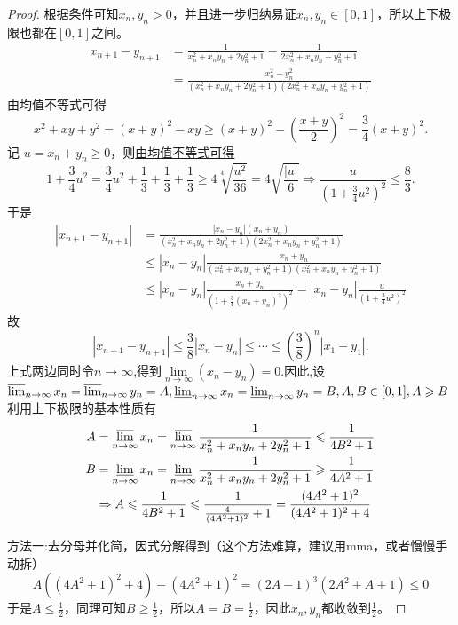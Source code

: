 \documentclass[../../main.tex]{subfiles}%
\begin{document}
\begin{proof}
根据条件可知\(x_n,y_n > 0\)，并且进一步归纳易证\(x_n,y_n\in[0,1]\)，所以上下极限也都在\([0,1]\)之间。
\begin{align*}
x_{n + 1}-y_{n + 1}&=\frac{1}{x_n^2 + x_ny_n + 2y_n^2 + 1}-\frac{1}{2x_n^2 + x_ny_n + y_n^2 + 1}\\
&=\frac{x_n^2 - y_n^2}{(x_n^2 + x_ny_n + 2y_n^2 + 1)(2x_n^2 + x_ny_n + y_n^2 + 1)}
\end{align*}
由均值不等式可得
\[
x^2 + xy + y^2=(x + y)^2 - xy\geqslant (x + y)^2 - \left(\frac{x + y}{2}\right)^2=\frac{3}{4}(x + y)^2.
\]
记 \(u = x_n + y_n\geqslant  0\)，则\hyperlink{均值放缩的思路}{由均值不等式可得}
\[
1+\frac{3}{4}u^2=\frac{3}{4}u^2+\frac{1}{3}+\frac{1}{3}+\frac{1}{3}\geqslant  4\sqrt[4]{\frac{u^2}{36}}=4\sqrt{\frac{|u|}{6}}\Rightarrow \frac{u}{(1+\frac{3}{4}u^2)^2}\leqslant \frac{8}{3}.
\]
于是
\begin{align*}
|x_{n + 1}-y_{n + 1}|&=\frac{|x_n - y_n|(x_n + y_n)}{(x_{n}^{2}+x_ny_n + 2y_{n}^{2}+1)(2x_{n}^{2}+x_ny_n + y_{n}^{2}+1)}\\
&\leqslant |x_n - y_n|\frac{x_n + y_n}{(x_{n}^{2}+x_ny_n + y_{n}^{2}+1)(x_{n}^{2}+x_ny_n + y_{n}^{2}+1)}\\
&\leqslant |x_n - y_n|\frac{x_n + y_n}{(1+\frac{3}{4}(x_n + y_n)^2)^2}=|x_n - y_n|\frac{u}{(1+\frac{3}{4}u^2)^2}
\end{align*}
故
\[
|x_{n + 1}-y_{n + 1}|\leqslant \frac{3}{8}|x_n - y_n|\leqslant \cdots \leqslant (\frac{3}{8})^n|x_1 - y_1|.
\]
上式两边同时令$n\to \infty$,得到$\underset{n\rightarrow \infty}{\lim}\left( x_n-y_n \right) =0$.因此,设
\(\varlimsup_{n\rightarrow\infty}x_n=\varlimsup_{n\rightarrow\infty}y_n = A,\varliminf_{n\rightarrow\infty}x_n=\varliminf_{n\rightarrow\infty}y_n = B,A,B\in[0,1],A\geqslant  B\)
利用上下极限的基本性质有
\begin{align*}
A&=\varlimsup_{n\rightarrow\infty}x_n=\varlimsup_{n\rightarrow\infty}\frac{1}{x_n^2 + x_ny_n + 2y_n^2 + 1}\leqslant \frac{1}{4B^2 + 1}\\
B&=\varliminf_{n\rightarrow\infty}x_n=\varliminf_{n\rightarrow\infty}\frac{1}{x_n^2 + x_ny_n + 2y_n^2 + 1}\geqslant \frac{1}{4A^2 + 1}\\
&\Rightarrow A\leqslant \frac{1}{4B^2 + 1}\leqslant \frac{1}{\frac{4}{(4A^2 + 1)^2}+1}=\frac{(4A^2 + 1)^2}{(4A^2 + 1)^2 + 4}
\end{align*}

{\color{blue}方法一:}去分母并化简，因式分解得到（这个方法难算，建议用mma，或者慢慢手动拆）
\[A((4A^2 + 1)^2 + 4)-(4A^2 + 1)^2=(2A - 1)^3(2A^2 + A + 1)\leqslant 0\]
于是\(A\leqslant \frac{1}{2}\)，同理可知\(B\geqslant \frac{1}{2}\)，所以\(A = B=\frac{1}{2}\)，因此\(x_n,y_n\)都收敛到\(\frac{1}{2}\)。


\end{proof}
\end{document}
